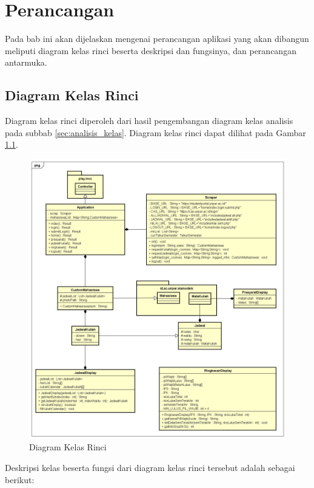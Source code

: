 \chapter{Perancangan}
\label{chap:perancangan}

Pada bab ini akan dijelaskan mengenai perancangan aplikasi yang akan dibangun meliputi diagram kelas rinci beserta deskripsi dan fungsinya, dan perancangan antarmuka.

\section{Diagram Kelas Rinci} 
\label{sec:diagram_kelas_rinci}
Diagram kelas rinci diperoleh dari hasil pengembangan diagram kelas analisis pada subbab \ref{sec:analisis_kelas}. Diagram kelas rinci dapat dilihat pada Gambar \ref{fig:4_final_class_diagram}. 
	\begin{figure}[ht]
			\centering
			\includegraphics[scale=0.45]{Gambar/class-diagram-final}
			\caption{Diagram Kelas Rinci} 
			\label{fig:4_final_class_diagram}
		\end{figure}
	Deskripsi kelas beserta fungsi dari diagram kelas rinci tersebut adalah sebagai berikut:
